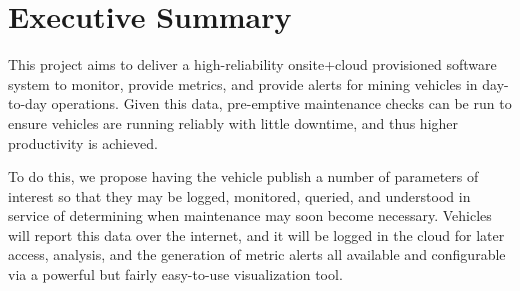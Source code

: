 \section{Executive Summary}
This project aims to deliver a high-reliability onsite+cloud provisioned software system to monitor, provide metrics, and provide alerts for mining vehicles in day-to-day operations. Given this data, pre-emptive maintenance checks can be run to ensure vehicles are running reliably with little downtime, and thus higher productivity is achieved.

To do this, we propose having the vehicle publish a number of parameters of interest so that they may be logged, monitored, queried, and understood in service of determining when maintenance may soon become necessary. Vehicles will report this data over the internet, and it will be logged in the cloud for later access, analysis, and the generation of metric alerts all available and configurable via a powerful but fairly easy-to-use visualization tool.